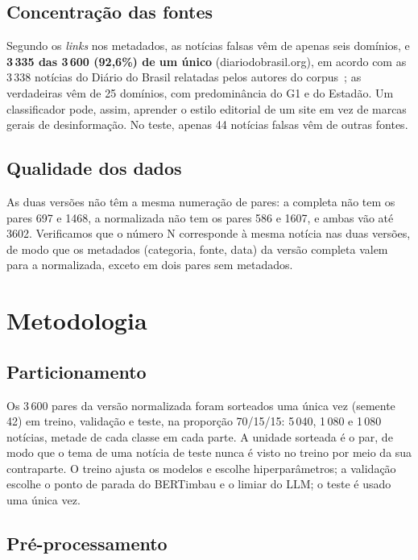 \subsection{Concentração das fontes}

Segundo os \emph{links} nos metadados, as notícias falsas vêm de apenas seis domínios, e \textbf{3\,335 das 3\,600 (92,6\%) de um único} (diariodobrasil.org), em acordo com as 3\,338 notícias do Diário do Brasil relatadas pelos autores do corpus~\citep{monteiro2018}; as verdadeiras vêm de 25 domínios, com predominância do G1 e do Estadão. Um classificador pode, assim, aprender o estilo editorial de um site em vez de marcas gerais de desinformação. No teste, apenas 44 notícias falsas vêm de outras fontes.

\subsection{Qualidade dos dados}

As duas versões não têm a mesma numeração de pares: a completa não tem os pares 697 e 1468, a normalizada não tem os pares 586 e 1607, e ambas vão até 3602. Verificamos que o número N corresponde à mesma notícia nas duas versões, de modo que os metadados (categoria, fonte, data) da versão completa valem para a normalizada, exceto em dois pares sem metadados.

\section{Metodologia}

\subsection{Particionamento}

Os 3\,600 pares da versão normalizada foram sorteados uma única vez (semente 42) em treino, validação e teste, na proporção 70/15/15: 5\,040, 1\,080 e 1\,080 notícias, metade de cada classe em cada parte. A unidade sorteada é o par, de modo que o tema de uma notícia de teste nunca é visto no treino por meio da sua contraparte. O treino ajusta os modelos e escolhe hiperparâmetros; a validação escolhe o ponto de parada do BERTimbau e o limiar do LLM; o teste é usado uma única vez.

\subsection{Pré-processamento}

